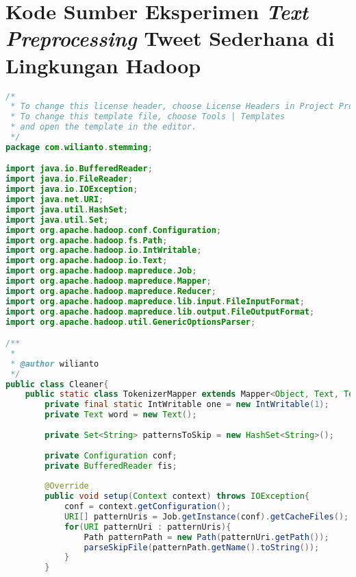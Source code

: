 \chapter{Kode Sumber Eksperimen \textit{Text Preprocessing} Tweet Sederhana di Lingkungan Hadoop}
\label{app:C}

\singlespacing 
%
%
\begin{lstlisting}[language=Java,basicstyle=\tiny,caption=Stemming.java]
/*
 * To change this license header, choose License Headers in Project Properties.
 * To change this template file, choose Tools | Templates
 * and open the template in the editor.
 */
package com.wilianto.stemming;

import java.io.BufferedReader;
import java.io.FileReader;
import java.io.IOException;
import java.net.URI;
import java.util.HashSet;
import java.util.Set;
import org.apache.hadoop.conf.Configuration;
import org.apache.hadoop.fs.Path;
import org.apache.hadoop.io.IntWritable;
import org.apache.hadoop.io.Text;
import org.apache.hadoop.mapreduce.Job;
import org.apache.hadoop.mapreduce.Mapper;
import org.apache.hadoop.mapreduce.Reducer;
import org.apache.hadoop.mapreduce.lib.input.FileInputFormat;
import org.apache.hadoop.mapreduce.lib.output.FileOutputFormat;
import org.apache.hadoop.util.GenericOptionsParser;

/**
 *
 * @author wilianto
 */
public class Cleaner{
    public static class TokenizerMapper extends Mapper<Object, Text, Text, IntWritable>{
        private final static IntWritable one = new IntWritable(1);
        private Text word = new Text();
        
        private Set<String> patternsToSkip = new HashSet<String>();
        
        private Configuration conf;
        private BufferedReader fis;
        
        @Override
        public void setup(Context context) throws IOException{
            conf = context.getConfiguration();
            URI[] patternUris = Job.getInstance(conf).getCacheFiles();
            for(URI patternUri : patternUris){
                Path patternPath = new Path(patternUri.getPath());
                parseSkipFile(patternPath.getName().toString());
            }
        }
        

\end{lstlisting}
